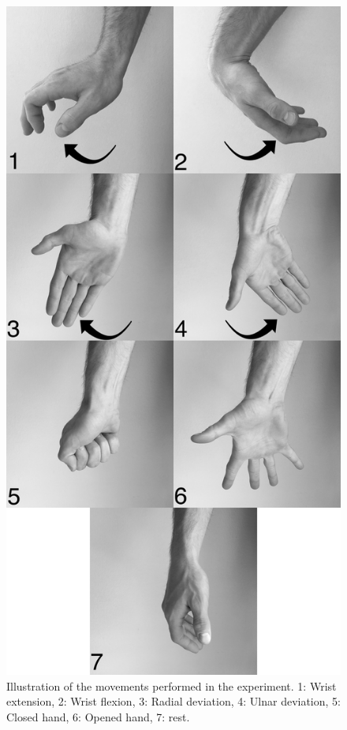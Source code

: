 \begin{figure}[H]                 
	\includegraphics[width=.35\textwidth]{figures/Paper/allHandMovementsVerticalBW}  
	\caption{Illustration of the movements performed in the experiment. 1: Wrist extension, 2: Wrist flexion, 3: Radial deviation, 4: Ulnar deviation, 5: Closed hand, 6: Opened hand, 7: rest.}
	\label{fig:P:experiment_movements} 
\end{figure}